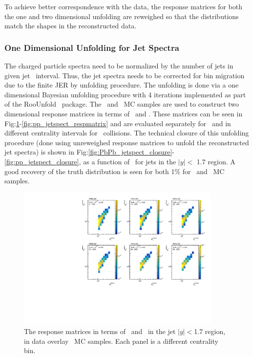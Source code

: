  To achieve better correspondence with the data, the response matrices for both the one and two dimensional unfolding are reweighed so that the distributions match the shapes in the reconstructed data.
 

\subsubsection{One Dimensional Unfolding for Jet Spectra}
\label{sec:1dunfolding}
The charged particle spectra need to be normalized by the number of jets in given jet \pt\ interval. Thus, the jet spectra needs to be corrected for bin migration due to the finite JER by unfolding procedure. 
The unfolding is done via a one dimensional Bayesian unfolding procedure with 4 iterations implemented as part of the RooUnfold~\cite{Adye:2011gm} package. The \pp\ and \PbPb\ MC samples are used to construct two dimensional response matrices in terms of \ptjettruth\ and \ptjetreco. These matrices can be seen in Fig:\ref{fig:PbPb_jetspect_respmatrix}-\ref{fig:pp_jetspect_respmatrix} and are evaluated separately for \pp\ and in different centrality intervals for \PbPb\ collisions. The technical closure of this unfolding procedure (done using unreweighed response matrices to unfold the reconstructed jet spectra) is shown in Fig:\ref{fig:PbPb_jetspect_closure}-\ref{fig:pp_jetspect_closure}, as a function of \ptjet\ for jets in the $|y| < $ 1.7 region. A good recovery of the truth distribution is seen for both 1\% for \pbpb\ and \pp\ MC samples.

\begin{figure}[ht]
\centering
\includegraphics[page=5, width=0.9\textwidth]{figures/main/corrections/resp_matrix_jet_PbPb_MC.pdf}
\caption{The response matrices in terms of \ptjetreco\ and \ptjettruth\ in the jet $|y| < $1.7 region, in data overlay \pbpb\ MC samples. Each panel is a different centrality bin.}
\label{fig:PbPb_jetspect_respmatrix}
\end{figure}

